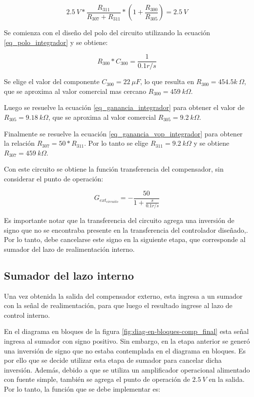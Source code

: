 \begin{equation} \label{eq_ganancia_vop_integrador}
	2.5\:V*\frac{R_{311}}{R_{307}+R_{311}}*(1+\frac{R_{300}}{R_{305}})=2.5\:V
\end{equation}

Se comienza con el diseño del polo del circuito utilizando la ecuación \ref{eq_polo_integrador} y se obtiene:

\begin{equation}
	R_{300}*C_{300}=\frac{1}{0.1r/s}
\end{equation}

Se elige el valor del componente $C_{300}=22\:\mu F$, lo que resulta en $R_{300}=454.5k\:\Omega$, que se aproxima al valor comercial mas cercano $R_{300}=459\:k\Omega$.

Luego se resuelve la ecuación \ref{eq_ganancia_integrador} para obtener el valor de $R_{305}=9.18\:k\Omega$, que se aproxima al valor comercial $R_{305}=9.2\:k\Omega$.

Finalmente se resuelve la ecuación \ref{eq_ganancia_vop_integrador} para obtener la relación $R_{307}=50*R_{311}$. Por lo tanto se elige $R_{311}=9.2\:k\Omega$ y se obtiene $R_{307}=459\:k\Omega$.


Con este circuito se obtiene la función transferencia del compensador, sin considerar el punto de operación:

\begin{equation} \label{eq_gexterno_circuito}
	G_{ext_{circuito}}=-\frac{50}{1+\frac{s}{0.1r/s}}
\end{equation}

Es importante notar que la transferencia del circuito agrega una inversión de signo que no se encontraba presente en la transferencia del controlador diseñado,. Por lo tanto, debe cancelarse este signo en la siguiente etapa, que corresponde al sumador del lazo de realimentación interno.


\subsection{Sumador del lazo interno}

Una vez obtenida la salida del compensador externo, esta ingresa a un sumador con la señal de realimentación, para que luego el resultado ingrese al lazo de control interno.

En el diagrama en bloques de la figura \ref{fig:diag-en-bloques-comp_final} esta señal ingresa al sumador con signo positivo. Sin embargo, en la etapa anterior se generó una inversión de signo que no estaba contemplada en el diagrama en bloques. Es por ello que se decide utilizar esta etapa de sumador para cancelar dicha inversión. Además, debido a que se utiliza un amplificador operacional alimentado con fuente simple, también se agrega el punto de operación de $2.5\:V$ en la salida. Por lo tanto, la función que se debe implementar es:


